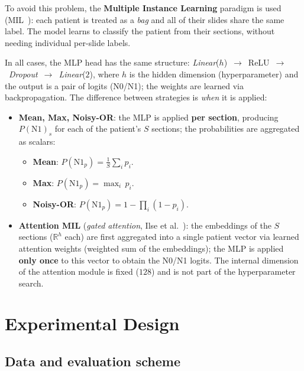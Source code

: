 \documentclass[10pt,a4paper,twocolumn,twoside]{article}
\begin{document}
To avoid this problem, the \textbf{Multiple Instance Learning} paradigm is used
(MIL~\cite{dietterich1997mil}): each patient is treated as a \textit{bag} and all of their
slides share the same label. The model learns to classify the patient from
their sections, without needing individual per-slide labels.

In all cases, the MLP head has the same structure:
\textit{Linear}($h$)~$\to$~ReLU~$\to$~\textit{Dropout}~$\to$~\textit{Linear}($2$), where
$h$ is the hidden dimension (hyperparameter) and the output is a pair of logits (N0/N1);
the weights are learned via backpropagation. The difference between strategies is \emph{when} it is applied:

\begin{itemize}
    \item \textbf{Mean, Max, Noisy-OR}: the MLP is applied \textbf{per section}, producing
    $P(\text{N1})_s$ for each of the patient's $S$ sections; the probabilities
    are aggregated as scalars:
    \begin{itemize}\itemsep0pt
        \item \textbf{Mean}: $P(\text{N1}_{p}) = \frac{1}{S}\sum_i p_i$.
        \item \textbf{Max}: $P(\text{N1}_{p}) = \max_i\,p_i$.
        \item \textbf{Noisy-OR}: $P(\text{N1}_{p}) = 1 - \prod_{i}(1 - p_i)$.
    \end{itemize}
    \item \textbf{Attention MIL} (\textit{gated attention},
    Ilse et al.~\cite{ilse2018attentionbaseddeepmultipleinstance}): the embeddings of the
    $S$ sections ($\mathbb{R}^{h}$ each) are first aggregated into a single patient vector
    via learned attention weights (weighted sum of the embeddings); the MLP is applied
    \textbf{only once} to this vector to obtain the N0/N1 logits. The
    internal dimension of the attention module is fixed ($128$) and is not part of the hyperparameter search.
\end{itemize}

\section{Experimental Design}

\subsection{Data and evaluation scheme}
\label{sec:training-scheme}
\end{document}
